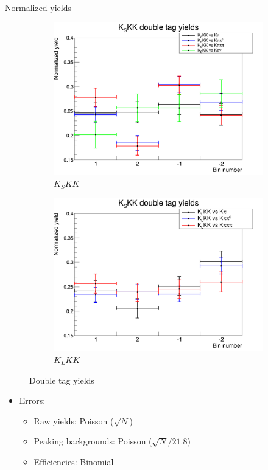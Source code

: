 \documentclass{beamer}
\begin{document}
\begin{frame}{Normalized yields}
  \begin{figure}
    \centering
    \begin{subfigure}{0.5\textwidth}
      \centering
      \includegraphics[width=\textwidth]{DoubleTagYieldKSKK.png}
      \caption{$K_SKK$}
    \end{subfigure}%
    \begin{subfigure}{0.5\textwidth}
      \centering
      \includegraphics[width=\textwidth]{DoubleTagYieldKLKK.png}
      \caption{$K_LKK$}
    \end{subfigure}
    \caption{Double tag yields}
  \end{figure}
  \vspace{-0.5cm}
  \begin{itemize}
    \item{Errors:}
    \begin{itemize}
      \item{Raw yields: Poisson ($\sqrt{N}$)}
      \item{Peaking backgrounds: Poisson ($\sqrt{N}/21.8$)}
      \item{Efficiencies: Binomial}
    \end{itemize}
  \end{itemize}
\end{frame}
\end{document}
